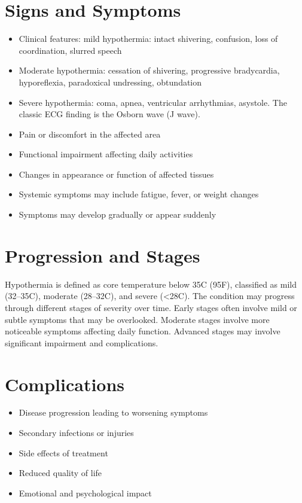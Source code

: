 \section{Signs and Symptoms}
\begin{itemize}[noitemsep]
  \item Clinical features: mild hypothermia: intact shivering, confusion, loss of coordination, slurred speech
  \item Moderate hypothermia: cessation of shivering, progressive bradycardia, hyporeflexia, paradoxical undressing, obtundation
  \item Severe hypothermia: coma, apnea, ventricular arrhythmias, asystole. The classic ECG finding is the Osborn wave (J wave).
  \item Pain or discomfort in the affected area
  \item Functional impairment affecting daily activities
  \item Changes in appearance or function of affected tissues
  \item Systemic symptoms may include fatigue, fever, or weight changes
  \item Symptoms may develop gradually or appear suddenly
\end{itemize}
\section{Progression and Stages}
Hypothermia is defined as core temperature below 35\textdegree C (95\textdegree F), classified as mild (32--35\textdegree C), moderate (28--32\textdegree C), and severe (<28\textdegree C). The condition may progress through different stages of severity over time. Early stages often involve mild or subtle symptoms that may be overlooked. Moderate stages involve more noticeable symptoms affecting daily function. Advanced stages may involve significant impairment and complications.
\section{Complications}
\begin{itemize}[noitemsep]
  \item Disease progression leading to worsening symptoms
  \item Secondary infections or injuries
  \item Side effects of treatment
  \item Reduced quality of life
  \item Emotional and psychological impact
\end{itemize}
